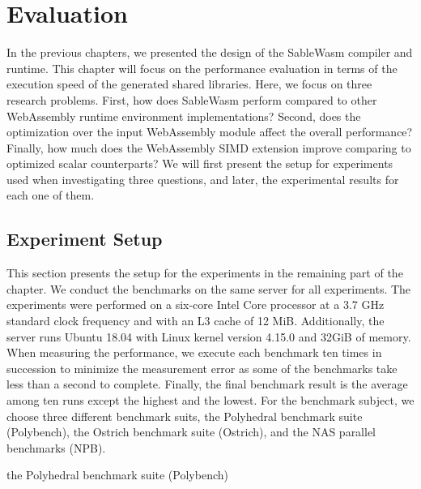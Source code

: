 \chapter{Evaluation}

In the previous chapters, we presented the design of the SableWasm compiler and
runtime. This chapter will focus on the performance evaluation in terms of the
execution speed of the generated shared libraries. Here, we focus on three
research problems. First, how does SableWasm perform compared to other
WebAssembly runtime environment implementations? Second, does the optimization
over the input WebAssembly module affect the overall performance? Finally, how
much does the WebAssembly SIMD extension improve comparing to optimized scalar
counterparts? We will first present the setup for experiments used when
investigating three questions, and later, the experimental results for each one
of them.

\section{Experiment Setup}

This section presents the setup for the experiments in the remaining part of the
chapter. We conduct the benchmarks on the same server for all experiments.
The experiments were performed on a six-core Intel Core processor at a 3.7 GHz
standard clock frequency and with  an L3 cache of 12 MiB. Additionally, the
server runs Ubuntu 18.04 with Linux kernel version 4.15.0 and 32GiB of memory.
When measuring the performance, we execute each benchmark ten times in
succession to minimize the measurement error as some of the benchmarks take less
than a second to complete. Finally, the final benchmark result is the average
among ten runs except the highest and the lowest. For the benchmark subject,
we choose three different benchmark suits, the Polyhedral benchmark suite
(Polybench), the Ostrich benchmark suite (Ostrich), and the NAS parallel
benchmarks (NPB).

\begin{table}
    \centering
    
    \caption{the Polyhedral benchmark suite (Polybench)}
    \label{tbl:polybench}
\end{table}

